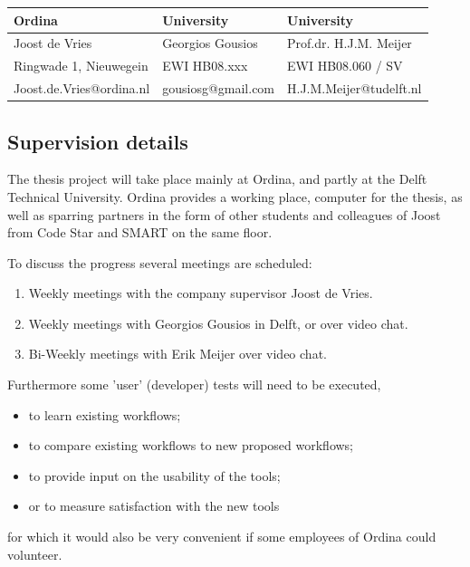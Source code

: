 \documentclass[11pt,a4paper]{article}
\begin{document}
\begin{table}[h]
    \centering
    \begin{tabular}{@{}lll@{}}
        \textbf{Ordina}             & \textbf{University}     & \textbf{University}     \\ 
        \hline
        Joost de Vries              & Georgios Gousios        & Prof.dr. H.J.M. Meijer  \\ 
        Ringwade 1, Nieuwegein      & EWI HB08.xxx            & EWI HB08.060 / SV       \\ %
         
        Joost.de.Vries@ordina.nl    & gousiosg@gmail.com      & H.J.M.Meijer@tudelft.nl \\ 
    \end{tabular}
\end{table}

\subsection{Supervision details} The thesis project will take place
mainly at Ordina, and partly at the Delft Technical University.  Ordina
provides a working place, computer for the thesis, as well as sparring
partners in the form of other students and colleagues of Joost from Code
Star and SMART on the same floor.

\noindent
To discuss the progress several meetings are scheduled:
\begin{enumerate}
    \item
        Weekly meetings with the company supervisor Joost de Vries.
    \item
        Weekly meetings with Georgios Gousios in Delft, or over video
        chat.
    \item
        Bi-Weekly meetings with Erik Meijer over video chat.
\end{enumerate}

\noindent
Furthermore some 'user' (developer) tests will need to be executed,
\begin{itemize}
    \item
        to learn existing workflows;
    \item
        to compare existing workflows to new proposed workflows;
    \item
        to provide input on the usability of the tools;
    \item
        or to measure satisfaction with the new tools
\end{itemize}
for which it would also be very convenient if some employees of Ordina
could volunteer.
\end{document}
